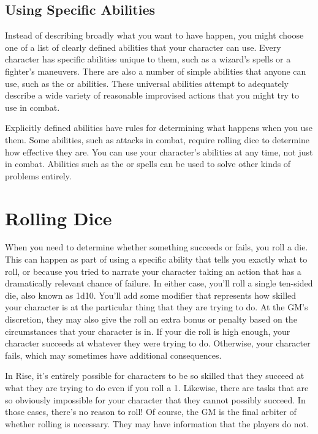   \subsection{Using Specific Abilities}
    Instead of describing broadly what you want to have happen, you might choose one of a list of clearly defined abilities that your character can use.
    Every character has specific abilities unique to them, such as a wizard's spells or a fighter's maneuvers.
    There are also a number of simple abilities that anyone can use, such as the  or  abilities.
    These universal abilities attempt to adequately describe a wide variety of reasonable improvised actions that you might try to use in combat.

    Explicitly defined abilities have rules for determining what happens when you use them.
    Some abilities, such as attacks in combat, require rolling dice to determine how effective they are.
    You can use your character's abilities at any time, not just in combat.
    Abilities such as the  or  spells can be used to solve other kinds of problems entirely.

\section{Rolling Dice}
  When you need to determine whether something succeeds or fails, you roll a die.
  This can happen as part of using a specific ability that tells you exactly what to roll, or because you tried to narrate your character taking an action that has a dramatically relevant chance of failure.
  In either case, you'll roll a single ten-sided die, also known as 1d10.
  You'll add some modifier that represents how skilled your character is at the particular thing that they are trying to do.
  At the GM's discretion, they may also give the roll an extra bonus or penalty based on the circumstances that your character is in.
  If your die roll is high enough, your character succeeds at whatever they were trying to do.
  Otherwise, your character fails, which may sometimes have additional consequences.

  In Rise, it's entirely possible for characters to be so skilled that they succeed at what they are trying to do even if you roll a 1.
  Likewise, there are tasks that are so obviously impossible for your character that they cannot possibly succeed.
  In those cases, there's no reason to roll!
  Of course, the GM is the final arbiter of whether rolling is necessary.
  They may have information that the players do not.

